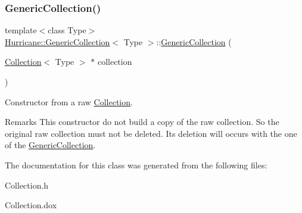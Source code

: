 \subsubsection{\texorpdfstring{Generic\+Collection()}{GenericCollection()}\hspace{0.1cm}{\footnotesize\ttfamily [3/3]}}
{\footnotesize\ttfamily template$<$class Type$>$ \\
\mbox{\hyperlink{classHurricane_1_1GenericCollection}{Hurricane\+::\+Generic\+Collection}}$<$ Type $>$\+::\mbox{\hyperlink{classHurricane_1_1GenericCollection}{Generic\+Collection}} (\begin{DoxyParamCaption}\item[{\mbox{\hyperlink{classHurricane_1_1Collection}{Collection}}$<$ Type $>$ $\ast$}]{collection }\end{DoxyParamCaption})\hspace{0.3cm}{\ttfamily [inline]}}

Constructor from a raw \mbox{\hyperlink{classHurricane_1_1Collection}{Collection}}.

\begin{DoxyRemark}{Remarks}
This constructor do not build a copy of the raw collection. So the original raw collection must not be deleted. It\textquotesingle{}s deletion will occurs with the one of the \mbox{\hyperlink{classHurricane_1_1GenericCollection}{Generic\+Collection}}. 
\end{DoxyRemark}


The documentation for this class was generated from the following files\+:\begin{DoxyCompactItemize}
\item 
Collection.\+h\item 
Collection.\+dox\end{DoxyCompactItemize}
